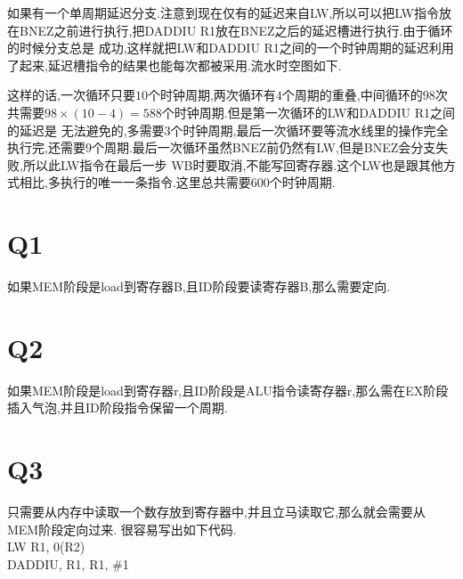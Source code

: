 \documentclass[adobefonts, nocap]{ctexart}
\begin{document}
    如果有一个单周期延迟分支.注意到现在仅有的延迟来自LW,所以可以把LW指令放在BNEZ之前进行执行,把DADDIU R1放在BNEZ之后的延迟槽进行执行.由于循环的时候分支总是
    成功,这样就把LW和DADDIU R1之间的一个时钟周期的延迟利用了起来,延迟槽指令的结果也能每次都被采用.流水时空图如下.

    这样的话,一次循环只要$10$个时钟周期,两次循环有$4$个周期的重叠,中间循环的$98$次共需要$98\times (10-4)=588$个时钟周期.但是第一次循环的LW和DADDIU R1之间的延迟是
    无法避免的,多需要$3$个时钟周期,最后一次循环要等流水线里的操作完全执行完,还需要$9$个周期.最后一次循环虽然BNEZ前仍然有LW,但是BNEZ会分支失败,所以此LW指令在最后一步
    WB时要取消,不能写回寄存器.这个LW也是跟其他方式相比,多执行的唯一一条指令.这里总共需要$600$个时钟周期.

    {\footnotesize
    }
  \section*{Q1}
    如果MEM阶段是load到寄存器B,且ID阶段要读寄存器B,那么需要定向.
  \section*{Q2}
    如果MEM阶段是load到寄存器r,且ID阶段是ALU指令读寄存器r,那么需在EX阶段插入气泡,并且ID阶段指令保留一个周期.
  \section*{Q3}
    只需要从内存中读取一个数存放到寄存器中,并且立马读取它,那么就会需要从MEM阶段定向过来.
    很容易写出如下代码. \\
    LW R1, 0(R2) \\
    DADDIU, R1, R1, \#1
\end{document}
